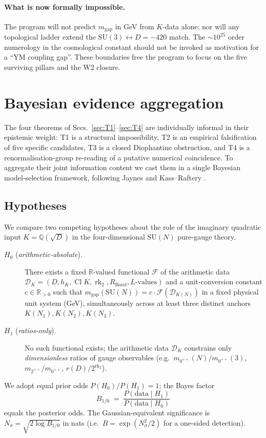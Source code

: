 \documentclass[aps,prl,reprint,superscriptaddress,floatfix,nofootinbib,amssymb]{revtex4-2}
\theoremstyle{definition}
\theoremstyle{remark}
\DeclareMathOperator{\Cl}{Cl}
\DeclareMathOperator{\rk}{rk}
\newcommand{\Q}{\mathbb{Q}}
\newcommand{\R}{\mathbb{R}}
\begin{document}
\paragraph{What is now formally impossible.}
The program will not predict $m_{\text{gap}}$ in GeV from $K$-data
alone; nor will any topological ladder extend the $\mathrm{SU}(3)
\leftrightarrow D=-420$ match. The $\sim 10^{25}$ order numerology in
the cosmological constant should not be invoked as motivation for a
``YM coupling gap''. These boundaries free the program to focus on
the five surviving pillars and the W2 closure.

\section{Bayesian evidence aggregation}\label{sec:bayes}

The four theorems of Secs.~\ref{sec:T1}--\ref{sec:T4} are individually
informal in their epistemic weight: T1 is a structural impossibility,
T2 is an empirical falsification of five specific candidates, T3 is a
closed Diophantine obstruction, and T4 is a renormalisation-group
re-reading of a putative numerical coincidence. To aggregate their
joint information content we cast them in a single Bayesian
model-selection framework, following Jaynes
\cite{Jaynes2003} and Kass--Raftery \cite{KassRaftery1995}.

\subsection{Hypotheses}\label{sec:bayes:hyps}

We compare two competing hypotheses about the role of the imaginary
quadratic input $K=\Q(\sqrt D)$ in the four-dimensional
$\mathrm{SU}(N)$ pure-gauge theory.
\begin{description}
\item[$H_0$ (\emph{arithmetic-absolute}).] There exists a fixed
$\R$-valued functional $\mathcal F$ of the arithmetic data
$\mathcal D_K = (D, h_K, \Cl K, \rk_2, R_{\mathrm{Borel}}, L\text{-values})$
and a unit-conversion constant $c \in \R_{>0}$ such that
$m_{\text{gap}}(\mathrm{SU}(N)) = c \cdot \mathcal F(\mathcal D_{K(N)})$
in a fixed physical unit system (GeV), simultaneously across at
least three distinct anchors $K(N_1), K(N_2), K(N_3)$.
\item[$H_1$ (\emph{ratios-only}).] No such functional exists; the
arithmetic data $\mathcal D_K$ constrains only \emph{dimensionless}
ratios of gauge observables (e.g.\ $m_{0^{++}}(N)/m_{0^{++}}(3)$,
$m_{2^{++}}/m_{0^{++}}$, $r(D)/2^{\rk_2}$).
\end{description}
We adopt equal prior odds $P(H_0)/P(H_1) = 1$; the Bayes factor
\begin{equation}\label{eq:BF-def}
B_{1/0} \;=\; \frac{P(\text{data} \mid H_1)}
                  {P(\text{data} \mid H_0)}
\end{equation}
equals the posterior odds. The Gaussian-equivalent significance is
$N_\sigma = \sqrt{2 \log B_{1/0}}$ in nats (i.e.\ $B = \exp(N_\sigma^2/2)$
for a one-sided detection).
\end{document}
